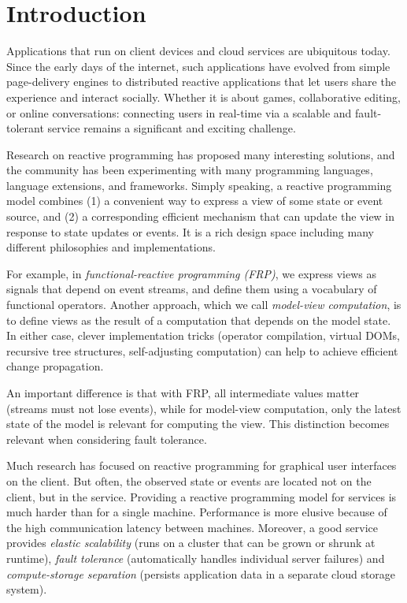 \section{Introduction}

Applications that run on client devices and cloud services are ubiquitous today. Since the early days of the internet, such applications have evolved from simple page-delivery engines to distributed reactive applications that let users share the experience and interact socially. Whether it is about games, collaborative editing, or online conversations: connecting users in real-time via a scalable and fault-tolerant service remains a significant and exciting challenge.

 Research on reactive programming has proposed many interesting solutions, and the community has been experimenting with many programming languages, language extensions, and frameworks. Simply speaking, a reactive programming model combines (1) a convenient way to express a view of some state or event source, and (2) a corresponding efficient mechanism that can update the view in response to state updates or events. It is a rich design space including many different philosophies and implementations. 

For example, in \emph{functional-reactive programming (FRP)}, we express views as signals that depend on event streams, and define them using a vocabulary of functional operators. Another approach, which we call \emph{model-view computation}, is to define views as the result of a computation that depends on the model state. In either case, clever implementation tricks (operator compilation, virtual DOMs, recursive tree structures, self-adjusting computation) can help to achieve efficient change propagation. 

An important difference is that with FRP, all intermediate values matter (streams must not lose events), while for model-view computation, only the latest state of the model is relevant for computing the view. This distinction becomes relevant when considering fault tolerance.

 Much research has focused on reactive programming for graphical user interfaces \cite{} on the client. But often, the observed state or events are located not on the client, but in the service. Providing a reactive programming model for services is much harder than for a single machine. Performance is more elusive because of the high communication latency between machines. Moreover, a good service provides \emph{elastic scalability} (runs on a cluster that can be grown or shrunk at runtime),  \emph{fault tolerance} (automatically handles individual server failures) and \emph{compute-storage separation} (persists application data in a separate cloud storage system).

